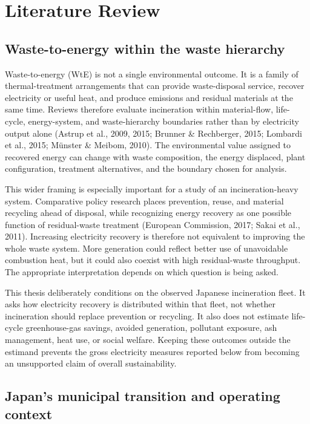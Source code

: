 \documentclass[12pt,letterpaper]{article}
\begin{document}
\section{Literature Review}

\subsection{Waste-to-energy within the waste hierarchy}

Waste-to-energy (WtE) is not a single environmental outcome. It is a family of
thermal-treatment arrangements that can provide waste-disposal service, recover
electricity or useful heat, and produce emissions and residual materials at the
same time. Reviews therefore evaluate incineration within material-flow,
life-cycle, energy-system, and waste-hierarchy boundaries rather than by
electricity output alone (Astrup et al., 2009, 2015; Brunner \& Rechberger, 2015;
Lombardi et al., 2015; M\"{u}nster \& Meibom, 2010). The environmental value
assigned to recovered energy can change with waste composition, the energy
displaced, plant configuration, treatment alternatives, and the boundary chosen
for analysis.

This wider framing is especially important for a study of an incineration-heavy
system. Comparative policy research places prevention, reuse, and material
recycling ahead of disposal, while recognizing energy recovery as one possible
function of residual-waste treatment (European Commission, 2017; Sakai et al.,
2011). Increasing electricity recovery is therefore not equivalent to improving
the whole waste system. More generation could reflect better use of unavoidable
combustion heat, but it could also coexist with high residual-waste throughput.
The appropriate interpretation depends on which question is being asked.

This thesis deliberately conditions on the observed Japanese incineration fleet.
It asks how electricity recovery is distributed within that fleet, not whether
incineration should replace prevention or recycling. It also does not estimate
life-cycle greenhouse-gas savings, avoided generation, pollutant exposure, ash
management, heat use, or social welfare. Keeping these outcomes outside the
estimand prevents the gross electricity measures reported below from becoming
an unsupported claim of overall sustainability.

\subsection{Japan's municipal transition and operating context}
\end{document}
